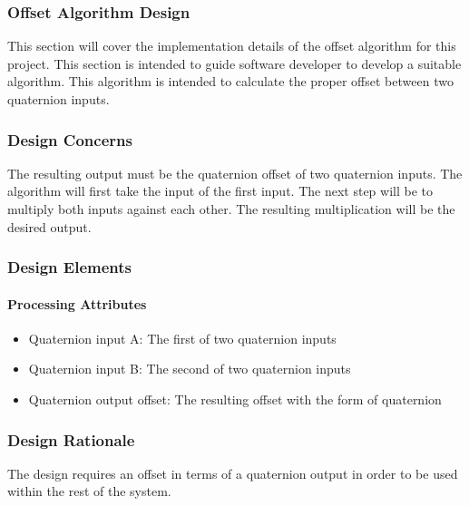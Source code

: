 	\subsubsection{Offset Algorithm Design}
	This section will cover the implementation details of the offset algorithm for this project. This section is intended to guide software developer to develop a suitable algorithm. This algorithm is intended to calculate the proper offset between two quaternion inputs.\\

	\subsubsection{Design Concerns}
	The resulting output must be the quaternion offset of two quaternion inputs. The algorithm will first take the input of the first input. The next step will be to multiply both inputs against each other. The resulting multiplication will be the desired output.\\

	\subsubsection{Design Elements}
		\paragraph{Processing Attributes}
				\begin{itemize}
					\item Quaternion input A: The first of two quaternion inputs
					\item Quaternion input B: The second of two quaternion inputs
					\item Quaternion output offset: The resulting offset with the form of quaternion\\
				\end{itemize}

	\subsubsection{Design Rationale}
	The design requires an offset in terms of a quaternion output in order to be used within the rest of the system. 

































